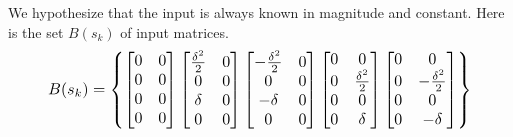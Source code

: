 \documentclass[twocolumn]{article}
\begin{document}
We hypothesize that the input is always known in magnitude and constant. Here is the set $B(s_{k})$ of input matrices.
    \begin{equation*}%
        \resizebox{.9 \columnwidth}{!}{
        $B(s_{k})=\begin{Bmatrix}
            \begin{bmatrix}
                0 & 0 \\
                0          & 0 \\
                0     & 0 \\
                0          & 0 \\
            \end{bmatrix}
            \begin{bmatrix}
                \frac{\delta^{2}}{2} & 0 \\
                0          & 0 \\
                \delta     & 0 \\
                0          & 0 \\
            \end{bmatrix}
            \begin{bmatrix}
                -\frac{\delta^{2}}{2} & 0 \\
                0          & 0 \\
                -\delta     & 0 \\
                0          & 0 \\
            \end{bmatrix}
            \begin{bmatrix}
                0 & 0          \\
                0 & \frac{\delta^{2}}{2} \\
                0 & 0          \\
                0 & \delta     \\
            \end{bmatrix}
            \begin{bmatrix}
                0 & 0          \\
                0 & -\frac{\delta^{2}}{2} \\
                0 & 0          \\
                0 & -\delta     \\
            \end{bmatrix}
        \end{Bmatrix} $ 
        }
    \end{equation*}
\end{document}
